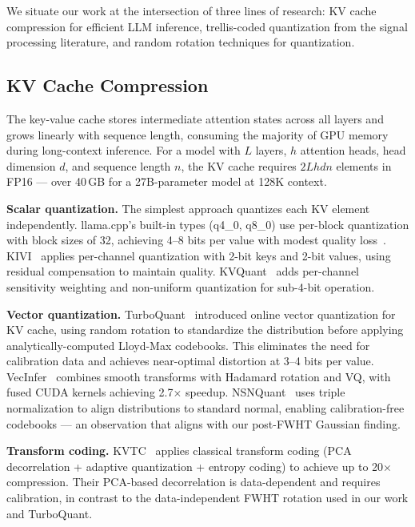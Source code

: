 \documentclass{article}
\begin{document}
We situate our work at the intersection of three lines of research: KV cache
compression for efficient LLM inference, trellis-coded quantization from the
signal processing literature, and random rotation techniques for quantization.

\subsection{KV Cache Compression}
\label{sec:bg_kvcache}

The key-value cache stores intermediate attention states across all layers and
grows linearly with sequence length, consuming the majority of GPU memory
during long-context inference. For a model with $L$ layers, $h$ attention
heads, head dimension $d$, and sequence length $n$, the KV cache requires
$2Lhdn$ elements in FP16 — over 40\,GB for a 27B-parameter model at 128K
context.

\textbf{Scalar quantization.} The simplest approach quantizes each KV element
independently. llama.cpp's built-in types (q4\_0, q8\_0) use per-block
quantization with block sizes of 32, achieving 4--8 bits per value with
modest quality loss~\cite{llama_cpp}. KIVI~\cite{kivi2024} applies per-channel
quantization with 2-bit keys and 2-bit values, using residual compensation
to maintain quality. KVQuant~\cite{kvquant2024} adds per-channel sensitivity
weighting and non-uniform quantization for sub-4-bit operation.

\textbf{Vector quantization.} TurboQuant~\cite{turboquant2026} introduced
online vector quantization for KV cache, using random rotation to
standardize the distribution before applying analytically-computed Lloyd-Max
codebooks. This eliminates the need for calibration data and achieves
near-optimal distortion at 3--4 bits per value. VecInfer~\cite{vecinfer2025}
combines smooth transforms with Hadamard rotation and VQ, with fused CUDA
kernels achieving 2.7$\times$ speedup. NSNQuant~\cite{nsnquant2025} uses triple
normalization to align distributions to standard normal, enabling calibration-free
codebooks — an observation that aligns with our post-FWHT Gaussian finding.

\textbf{Transform coding.} KVTC~\cite{kvtc2025} applies classical transform
coding (PCA decorrelation + adaptive quantization + entropy coding) to achieve
up to 20$\times$ compression. Their PCA-based decorrelation is data-dependent
and requires calibration, in contrast to the data-independent FWHT rotation
used in our work and TurboQuant.
\end{document}

